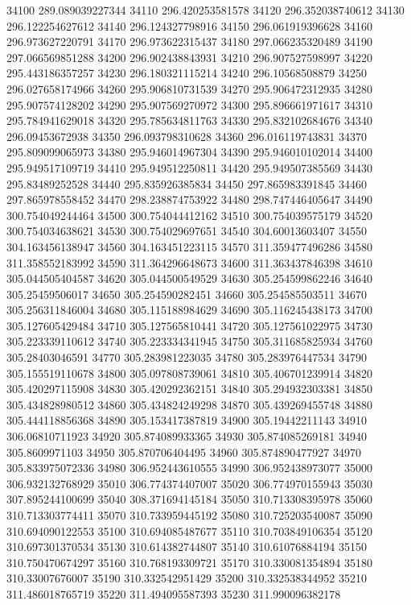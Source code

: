 {34100 289.089039227344
34110 296.420253581578
34120 296.352038740612
34130 296.122254627612
34140 296.124327798916
34150 296.061919396628
34160 296.973627220791
34170 296.973622315437
34180 297.066235320489
34190 297.066569851288
34200 296.902438843931
34210 296.907527598997
34220 295.443186357257
34230 296.180321115214
34240 296.10568508879
34250 296.027658174966
34260 295.906810731539
34270 295.906472312935
34280 295.907574128202
34290 295.907569270972
34300 295.896661971617
34310 295.784941629018
34320 295.785634811763
34330 295.832102684676
34340 296.09453672938
34350 296.093798310628
34360 296.016119743831
34370 295.809099065973
34380 295.946014967304
34390 295.946010102014
34400 295.949517109719
34410 295.949512250811
34420 295.949507385569
34430 295.83489252528
34440 295.835926385834
34450 297.865983391845
34460 297.865978558452
34470 298.238874753922
34480 298.747446405647
34490 300.754049244464
34500 300.754044412162
34510 300.754039575179
34520 300.754034638621
34530 300.754029697651
34540 304.60013603407
34550 304.163456138947
34560 304.163451223115
34570 311.359477496286
34580 311.358552183992
34590 311.364296648673
34600 311.363437846398
34610 305.044505404587
34620 305.044500549529
34630 305.254599862246
34640 305.25459506017
34650 305.254590282451
34660 305.254585503511
34670 305.256311846004
34680 305.115188984629
34690 305.116245438173
34700 305.127605429484
34710 305.127565810441
34720 305.127561022975
34730 305.223339110612
34740 305.223334341945
34750 305.311685825934
34760 305.28403046591
34770 305.283981223035
34780 305.283976447534
34790 305.155519110678
34800 305.097808739061
34810 305.406701239914
34820 305.420297115908
34830 305.420292362151
34840 305.294932303381
34850 305.434828980512
34860 305.434824249298
34870 305.439269455748
34880 305.444118856368
34890 305.153417387819
34900 305.19442211143
34910 306.06810711923
34920 305.874089933365
34930 305.874085269181
34940 305.8609971103
34950 305.870706404495
34960 305.874890477927
34970 305.833975072336
34980 306.952443610555
34990 306.952438973077
35000 306.932132768929
35010 306.774374407007
35020 306.774970155943
35030 307.895244100699
35040 308.371694145184
35050 310.713308395978
35060 310.713303774411
35070 310.733959445192
35080 310.725203540087
35090 310.694090122553
35100 310.694085487677
35110 310.703849106354
35120 310.697301370534
35130 310.614382744807
35140 310.61076884194
35150 310.750470674297
35160 310.768193309721
35170 310.330081354894
35180 310.33007676007
35190 310.332542951429
35200 310.332538344952
35210 311.486018765719
35220 311.494095587393
35230 311.990096382178
}
